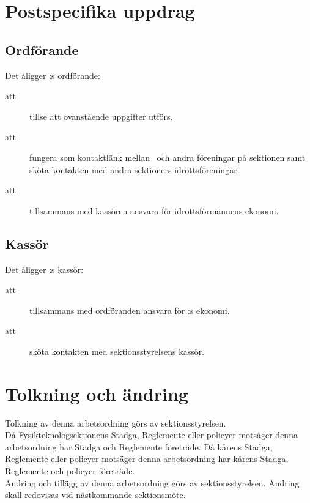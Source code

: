 \section{Postspecifika uppdrag}

\subsection{Ordförande}
Det åligger \forening:s ordförande:
    \begin{description}
      \item[att] tillse att ovanstående uppgifter utförs.
      \item[att] fungera som kontaktlänk mellan \forening \ och andra
      föreningar på sektionen samt sköta kontakten med andra
      sektioners idrotts\-före\-ning\-ar.
      \item[att] tillsammans med kassören ansvara för idrottsförmännens ekonomi.
    \end{description}

\subsection{Kassör}
Det åligger \forening:s kassör:
    \begin{description}
      \item[att] tillsammans med ordföranden ansvara för \forening:s ekonomi.
      \item[att] sköta kontakten med sektionsstyrelsens kassör.
    \end{description}


\section{Tolkning och ändring}
Tolkning av denna arbetsordning görs av sektionsstyrelsen.\\ Då Fysikteknologsektionens Stadga, Reglemente eller policyer motsäger denna arbetsordning har Stadga och Reglemente företräde. Då kårens Stadga, Reglemente eller policyer motsäger denna arbetsordning har kårens Stadga, Reglemente och policyer företräde.\\
Ändring och tillägg av denna arbetsordning görs av sektionsstyrelsen. Ändring skall redovisas vid nästkommande sektionsmöte. 

\newpage